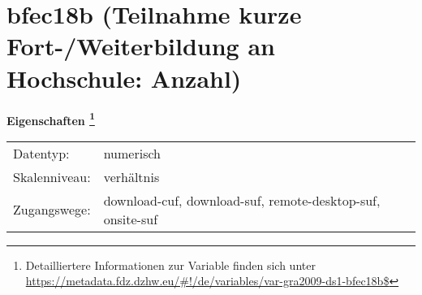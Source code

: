 
    \setcounter{footnote}{0}

    \vspace*{-1.8cm}
	\section{bfec18b (Teilnahme kurze Fort-/Weiterbildung an Hochschule: Anzahl)}
	\label{section:bfec18b}



    \vspace*{0.5cm}
    \noindent\textbf{Eigenschaften
	\footnote{Detailliertere Informationen zur Variable finden sich unter
		\url{https://metadata.fdz.dzhw.eu/\#!/de/variables/var-gra2009-ds1-bfec18b$}}}\\
	\begin{tabularx}{\hsize}{@{}lX}
	Datentyp: & numerisch \\
	Skalenniveau: & verhältnis \\
	Zugangswege: &
	  download-cuf, 
	  download-suf, 
	  remote-desktop-suf, 
	  onsite-suf
 \\
    \end{tabularx}



